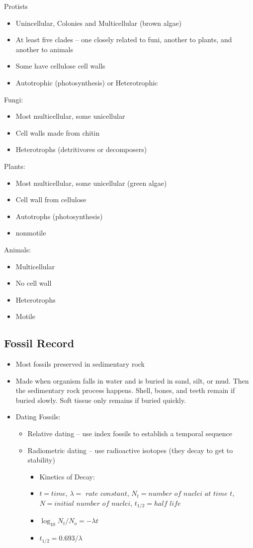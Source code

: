 \documentclass{article}
\begin{document}
Protists
\begin{itemize}
\item Unincellular, Colonies and Multicellular (brown algae)
\item At least five clades -- one closely related to funi, another to plants, and another to animals
\item Some have cellulose cell walls
\item Autotrophic (photosynthesis) or Heterotrophic
\end{itemize}

Fungi:
\begin{itemize}
\item Most multicellular, some unicellular
\item Cell walls made from chitin
\item Heterotrophs (detritivores or decomposers)
\end{itemize}

Plants:
\begin{itemize}
\item Most multicellular, some unicellular (green algae)
\item Cell wall from cellulose
\item Autotrophs (photosynthesis) \item nonmotile \end{itemize} Animals: \begin{itemize} \item Multicellular \item No cell wall \item Heterotrophs \item Motile \end{itemize}

\subsection{Fossil Record}
\begin{itemize}
\item Most fossils preserved in sedimentary rock
\item Made when organism falls in water and is buried in sand, silt, or mud. Then the sedimentary rock process happens. Shell, bones, and teeth remain if buried slowly. Soft tissue only remains if buried quickly.
\item Dating Fossils:
\begin{itemize}
\item Relative dating -- use index fossils to establish a temporal sequence
\item Radiometric dating -- use radioactive isotopes (they decay to get to stability)
\begin{itemize}
\item Kinetics of Decay:
\item $t=time$, $\lambda =$ $rate$ $constant$, $N_t =number$ $of$ $nuclei$ $at$ $time$ $t$, $N=initial$ $number$ $of$ $nuclei$, $t_{1/2}=half$ $life$
\item $\log_{10} {N_t/N_o} = -\lambda t$
\item $t_{1/2}={0.693}/{\lambda}$
\end{itemize}
\end{itemize}
\end{itemize}
\end{document}
